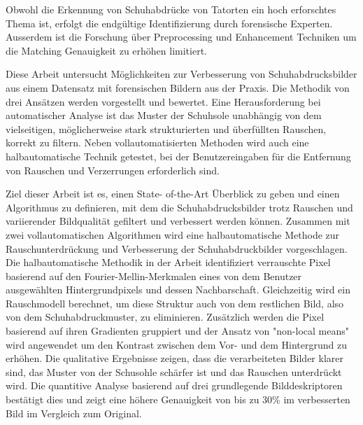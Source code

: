 \documentclass[draft,final]{vutinfth} %
\begin{document}
\begin{kurzfassung}
\par
Obwohl die Erkennung von Schuhabdrücke von Tatorten ein hoch erforschtes Thema ist, erfolgt die endgültige Identifizierung  durch forensische Experten.
Ausserdem ist die Forschung über Preprocessing und Enhancement Techniken um die Matching Genauigkeit zu erhöhen limitiert.
\par
Diese Arbeit untersucht Möglichkeiten zur Verbesserung von Schuhabdrucksbilder aus einem Datensatz mit forensischen Bildern aus der Praxis. 
Die Methodik von drei Ansätzen werden vorgestellt und bewertet. 
Eine Herausforderung bei automatischer Analyse ist das Muster der Schuhsole unabhängig von dem vielseitigen, möglicherweise stark strukturierten und überfüllten Rauschen, korrekt zu filtern.
Neben vollautomatisierten Methoden wird auch eine halbautomatische Technik getestet, bei der Benutzereingaben für die Entfernung von Rauschen und Verzerrungen erforderlich sind. 
\par
Ziel dieser Arbeit ist es, einen State- of-the-Art Überblick zu geben und einen Algorithmus zu definieren, mit dem die Schuhabdrucksbilder trotz Rauschen und variierender Bildqualität gefiltert und verbessert werden können.
Zusammen mit zwei vollautomatischen Algorithmen wird eine halbautomatische Methode zur Rauschunterdrückung und Verbesserung der Schuhabdruckbilder vorgeschlagen. 
Die halbautomatische Methodik in der Arbeit identifiziert verrauschte Pixel basierend auf den Fourier-Mellin-Merkmalen eines von dem Benutzer ausgewählten Hintergrundpixels und dessen Nachbarschaft. 
Gleichzeitig wird ein Rauschmodell berechnet, um diese Struktur auch von dem restlichen Bild, also von dem Schuhabdruckmuster, zu eliminieren. 
Zusätzlich werden die Pixel basierend auf ihren Gradienten gruppiert und der Ansatz von "non-local means"  wird angewendet um den Kontrast zwischen dem Vor- und dem Hintergrund zu erhöhen.
Die qualitative Ergebnisse zeigen, dass die verarbeiteten Bilder klarer sind, das Muster von der Schusohle schärfer ist und das Rauschen unterdrückt wird.
Die quantitive Analyse basierend auf drei grundlegende Bilddeskriptoren bestätigt dies und zeigt eine höhere Genauigkeit von bis zu 30\% im verbesserten Bild im Vergleich zum Original.
\end{kurzfassung}
\end{document}
